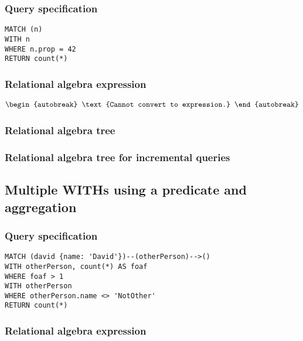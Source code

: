 \subsubsection*{Query specification}

\begin{lstlisting}
MATCH (n)
WITH n
WHERE n.prop = 42
RETURN count(*)
\end{lstlisting}

\subsubsection*{Relational algebra expression}

\begin{align*}
\begin{autobreak}
\text{Cannot convert to expression.}
\end{autobreak}
\end{align*}

\subsubsection*{Relational algebra tree}


\subsubsection*{Relational algebra tree for incremental queries}


\subsection{Multiple WITHs using a predicate and aggregation}

\subsubsection*{Query specification}

\begin{lstlisting}
MATCH (david {name: 'David'})--(otherPerson)-->()
WITH otherPerson, count(*) AS foaf
WHERE foaf > 1
WITH otherPerson
WHERE otherPerson.name <> 'NotOther'
RETURN count(*)
\end{lstlisting}

\subsubsection*{Relational algebra expression}

